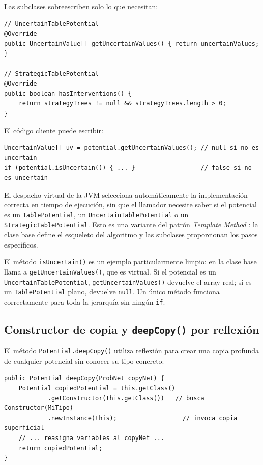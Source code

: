 \documentclass[11pt,a4paper]{article}
\newcommand{\code}[1]{\texttt{#1}}
\begin{document}
Las subclases sobreescriben solo lo que necesitan:

\begin{lstlisting}[caption={Sobreescrituras en las subclases}]
// UncertainTablePotential
@Override
public UncertainValue[] getUncertainValues() { return uncertainValues; }

// StrategicTablePotential
@Override
public boolean hasInterventions() {
    return strategyTrees != null && strategyTrees.length > 0;
}
\end{lstlisting}

El código cliente puede escribir:
\begin{lstlisting}
UncertainValue[] uv = potential.getUncertainValues(); // null si no es uncertain
if (potential.isUncertain()) { ... }                  // false si no es uncertain
\end{lstlisting}

El despacho virtual de la JVM selecciona automáticamente la implementación
correcta en tiempo de ejecución, sin que el llamador necesite saber si el
potencial es un \code{TablePotential}, un \code{UncertainTablePotential} o un
\code{StrategicTablePotential}.  Esto es una variante del patrón
\emph{Template Method} \cite{gamma1995}: la clase base define el esqueleto del
algoritmo y las subclases proporcionan los pasos específicos.

El método \code{isUncertain()} es un ejemplo particularmente limpio: en la clase
base llama a \code{getUncertainValues()}, que es virtual.  Si el potencial es un
\code{UncertainTablePotential}, \code{getUncertainValues()} devuelve el array real;
si es un \code{TablePotential} plano, devuelve \code{null}.  Un único método
funciona correctamente para toda la jerarquía sin ningún \code{if}.

\subsection{Constructor de copia y \code{deepCopy()} por reflexión}

El método \code{Potential.deepCopy()} utiliza reflexión para crear una copia
profunda de cualquier potencial sin conocer su tipo concreto:

\begin{lstlisting}[caption={Patrón de copia profunda por reflexión en \code{Potential}}]
public Potential deepCopy(ProbNet copyNet) {
    Potential copiedPotential = this.getClass()
            .getConstructor(this.getClass())   // busca Constructor(MiTipo)
            .newInstance(this);                  // invoca copia superficial
    // ... reasigna variables al copyNet ...
    return copiedPotential;
}
\end{lstlisting}
\end{document}
